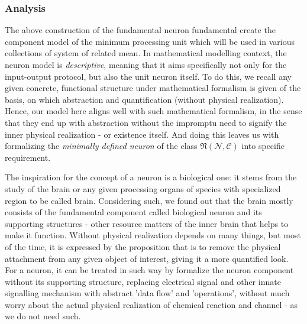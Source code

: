 \subsubsection{Analysis}
The above construction of the fundamental neuron fundamental create the component model of the minimum processing unit which will be used in various collections of system of related mean. In mathematical modelling context, the neuron model is \textit{descriptive}, meaning that it aims specifically not only for the input-output protocol, but also the unit neuron itself. To do this, we recall any given concrete, functional structure under mathematical formalism is given of the basis, on which abstraction and quantification (without physical realization). Hence, our model here aligns well with such mathematical formalism, in the sense that they end up with abstraction without the impromptu need to signify the inner physical realization - or existence itself. And doing this leaves us with formalizing the \textit{minimally defined neuron} of the class $\mathfrak{N}(\mathcal{N},\mathcal{C})$ into specific requirement. 

The inspiration for the concept of a neuron is a biological one: it stems from the study of the brain or any given processing organs of species with specialized region to be called brain. Considering such, we found out that the brain mostly consists of the fundamental component called biological neuron and its supporting structures - other resource matters of the inner brain that helps to make it function. Without physical realization depends on many things, but most of the time, it is expressed by the proposition that is to remove the physical attachment from any given object of interest, giving it a more quantified look. For a neuron, it can be treated in such way by formalize the neuron component without its supporting structure, replacing electrical signal and other innate signalling mechanism with abstract 'data flow' and 'operations', without much worry about the actual physical realization of chemical reaction and channel - as we do not need such. 

